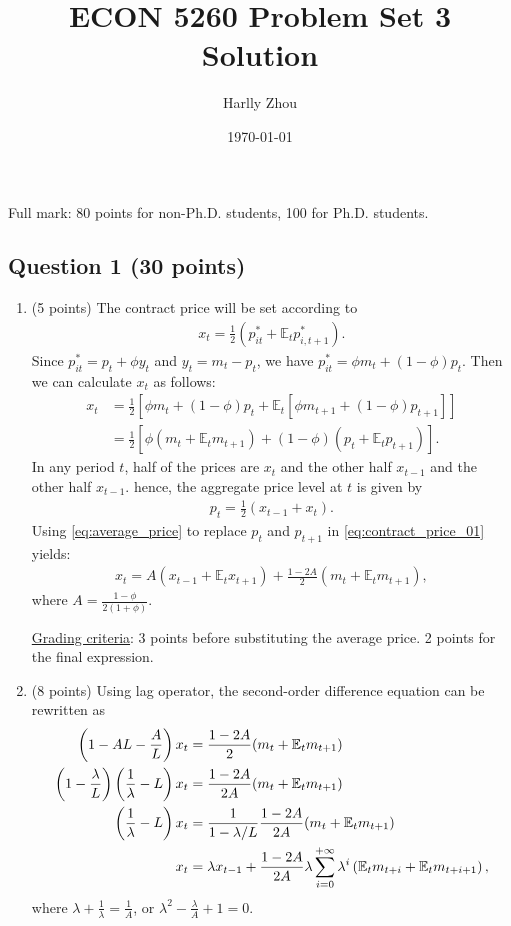 \documentclass[12pt]{article}
\title{ECON 5260 Problem Set 3 Solution}
\author{Harlly Zhou}
\date{\today}
\begin{document}
\maketitle

Full mark: 80 points for non-Ph.D. students, 100 for Ph.D. students.

\subsection*{Question 1 (30 points)}
\begin{enumerate}
    \item (5 points) The contract price will be set according to
    \begin{align*}
        x_t = \frac{1}{2}\left(p_{it}^* + \mathbb{E}_t p ^*_{i, t+1}\right).
    \end{align*}
    Since $p^*_{it} = p_t + \phi y_t$ and $y_t = m_t - p_t$, we have $p^*_{it} = \phi m_t + (1-\phi)p_t$. Then we can calculate $x_t$ as follows:
    \begin{align}\label{eq:contract_price_01}
        x_t &= \frac{1}{2}\left[\phi m_t + (1-\phi) p_t + \mathbb{E}_t[\phi m_{t+1} + (1-\phi)p_{t+1}]\right]\\
        &= \frac{1}{2} \left[\phi(m_t + \mathbb{E}_t m_{t+1}) + (1-\phi)(p_t + \mathbb{E}_t p_{t+1})\right]. 
    \end{align}
    In any period $t$, half of the prices are $x_t$ and the other half $x_{t-1}$ and the other half $x_{t-1}$. hence, the aggregate price level at $t$ is given by
    \begin{align}\label{eq:average_price}
        p_t = \frac{1}{2}(x_{t-1} + x_t).
    \end{align}
    Using \eqref{eq:average_price} to replace $p_t$ and $p_{t+1}$ in \eqref{eq:contract_price_01} yields:
    \begin{align*}
        x_t = A(x_{t-1} + \mathbb{E}_t x_{t+1}) + \frac{1-2A}{2}(m_t + \mathbb{E}_t m_{t+1}),
    \end{align*}
    where $A = \frac{1-\phi}{2(1+\phi)}$.

    \underline{Grading criteria}: 3 points before substituting the average price. 2 points for the final expression.

    \item (8 points) Using lag operator, the second-order difference equation can be rewritten as
    \begin{align}
        \left(1-AL - \frac{A}{L}\right) x_t &= \frac{1-2A}{2} (m_t + \mathbb{E}_t m_{t+1}) \notag \\
        \left(1-\frac{\lambda}{L}\right)\left(\frac{1}{\lambda} - L\right) x_t &= \frac{1-2A}{2A}(m_t + \mathbb{E}_t m_{t+1}) \notag \\
        \left(\frac{1}{\lambda} - L\right) x_t &= \frac{1}{1-\lambda/L} \frac{1-2A}{2A} (m_t + \mathbb{E}_t m_{t+1}) \notag \\
        x_t &= \lambda x_{t-1} + \frac{1-2A}{2A} \lambda \sum_{i=0}^{+\infty} \lambda^i\left(\mathbb{E}_t m_{t+i} + \mathbb{E}_t m_{t+i+1}\right) \label{eq:contract_price_02},
    \end{align}
    where $\lambda + \frac{1}{\lambda} = \frac{1}{A}$, or $\lambda^2 - \frac{\lambda}{A} + 1 = 0$.


\end{enumerate}
\end{document}
